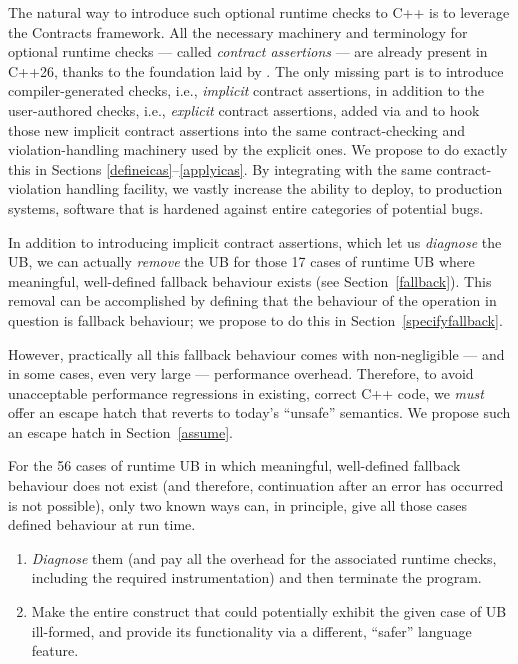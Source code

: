 The natural way to introduce such optional runtime checks to C++ is to leverage the Contracts framework. All the necessary machinery and terminology for optional runtime checks --- called \emph{contract assertions} --- are already present in C++26, thanks to the foundation laid by \cite{P2900R14}. The only missing part is to introduce compiler-generated checks, i.e., \emph{implicit} contract assertions, in addition to the user-authored checks, i.e., \emph{explicit} contract assertions,  added via \cite{P2900R14} and to hook those new implicit contract assertions into the same contract-checking and violation-handling machinery used by the explicit ones. We propose to do exactly this in Sections \ref{defineicas}--\ref{applyicas}. By integrating with the same contract-violation handling facility, we vastly increase the ability to deploy, to production systems, software that is hardened against entire categories of potential bugs.

In addition to introducing implicit contract assertions, which let us \emph{diagnose} the UB, we can actually \emph{remove} the UB for those 17 cases of runtime UB where meaningful, well-defined fallback behaviour exists (see Section~\ref{fallback}). This removal can be accomplished by defining that the behaviour of the operation in question is fallback behaviour; we propose to do this in Section~\ref{specifyfallback}.

However, practically all this fallback behaviour comes with non-negligible --- and in some cases, even very large --- performance overhead. Therefore, to avoid unacceptable performance regressions in existing, correct C++ code, we \emph{must} offer an escape hatch that reverts to today's ``unsafe'' semantics. We propose such an escape hatch in Section~\ref{assume}.

For the 56 cases of runtime UB in which meaningful, well-defined fallback behaviour does not exist (and therefore, continuation after an error has occurred is not possible), only two known ways can, in principle, give all those cases defined behaviour at run time.
\begin{enumerate}
\item \emph{Diagnose} them (and pay all the overhead for the associated runtime checks, including the required instrumentation) and then terminate the program.
\item Make the entire construct that could potentially exhibit the given case of UB ill-formed, and provide its functionality via a different, ``safer'' language feature.
\end{enumerate}


